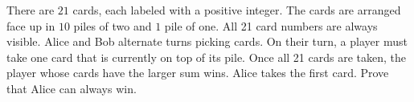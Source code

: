 There are $21$ cards, each labeled with a positive integer. The cards are arranged face up in $10$ piles of two and $1$ pile of one. All 21 card numbers are always visible. Alice and Bob alternate turns picking cards. On their turn, a player must take one card that is currently on top of its pile. Once all 21 cards are taken, the player whose cards have the larger sum wins. Alice takes the first card. Prove that Alice can always win.
